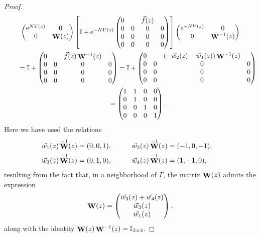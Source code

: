 \documentclass[10pt,a4paper]{amsart}
\DeclareMathOperator{\WW}{{\bf W}}
\numberwithin{equation}{section}
\begin{document}
\begin{proof}
 \begin{gather*}
 \begin{pmatrix}
 {\rm e}^{NV(z)} & 0 \\
 0 & \WW(z)
 \end{pmatrix}
 \left[
 \mathbb{I} + {\rm e}^{-NV(z)}
 \begin{pmatrix}
 0 & & \vec{f}(z) & \\
 0 & 0 & 0 & 0 \\
 0 & 0 & 0 & 0 \\
 0 & 0 & 0 & 0
 \end{pmatrix}\right]
 \begin{pmatrix}
 {\rm e}^{-NV(z)} & 0 \\
 0 & \WW^{-1}(z)
 \end{pmatrix}\\
 \qquad{}= \mathbb{I} +
 \begin{pmatrix}
 0 & & \vec{f}(z)\WW^{-1}(z) & \\
 0 & 0 & 0 & 0 \\
 0 & 0 & 0 & 0 \\
 0 & 0 & 0 & 0
 \end{pmatrix} = \mathbb{I} +
 \begin{pmatrix}
 0 & & (-\vec{w}_2(z) - \vec{w}_1(z))\WW^{-1}(z) & \\
 0 & 0 & 0 & 0 \\
 0 & 0 & 0 & 0 \\
 0 & 0 & 0 & 0
 \end{pmatrix} \\
 \qquad{}=
 \begin{pmatrix}
 1 & 1 & 0 & 0\\
 0 & 1 & 0 & 0 \\
 0 & 0 & 1 & 0 \\
 0 & 0 & 0 & 1
 \end{pmatrix}.
 \end{gather*}
 Here we have used the relations
 \begin{alignat*}{3}
 &\vec{w}_1(z)\WW^{-1}(z) = (0,0,1), \qquad&& \vec{w}_2(z)\WW^{-1}(z) = (-1,0,-1),&\\
 &\vec{w}_3(z)\WW^{-1}(z) = (0,1,0), \qquad&& \vec{w}_4(z)\WW^{-1}(z) = (1,-1,0),&
 \end{alignat*}
 resulting from the fact that, in a neighborhood of $\Gamma$, the matrix $\WW(z)$ admits the expression
 \begin{equation*}
 \WW(z) =
 \begin{pmatrix}
 \vec{w}_3(z) + \vec{w}_4(z) \\
 \vec{w}_3(z) \\
 \vec{w}_1(z)
 \end{pmatrix},
 \end{equation*}
 along with the identity $\WW(z) \WW^{-1}(z) = \mathbb{I}_{3\times 3}$.
\end{proof}
\end{document}
